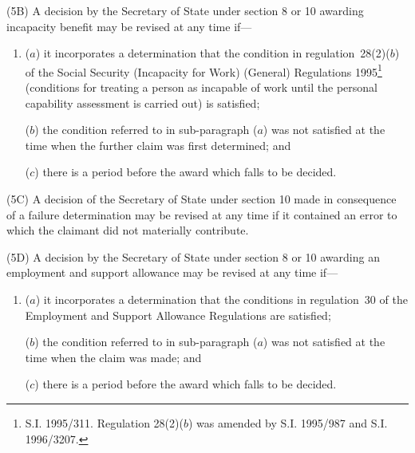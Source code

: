 \documentclass[12pt,a4paper]{article}
\begin{document}
(5B) A decision by the Secretary of State under section 8 or 10 awarding incapacity benefit may be revised at any time if—
\begin{enumerate}\item[]
\begin{sloppypar}
($a$) it incorporates a determination that the condition in regulation~28(2)($b$)  of the Social Security (Incapacity for Work) (General) Regulations 1995\footnote{S.I. 1995/311. Regulation 28(2)($b$) was amended by S.I. 1995/987 and S.I. 1996/3207.} (conditions for treating a person as incapable of work until the personal capability assessment is carried out) is satisfied;
\end{sloppypar}

($b$) the condition referred to in sub-paragraph ($a$)  was not satisfied at the time when the further claim was first determined; and

($c$) there is a period before the award which falls to be decided.
\end{enumerate}

(5C) A decision of the Secretary of State under section 10 made in consequence of a failure determination may be revised at any time if it contained an error to which the claimant did 
not materially contribute.

%
%

(5D) A decision by the Secretary of State under section 8 or 10 awarding an employment and support allowance may be revised at any time if—
\begin{enumerate}\item[]
($a$) it incorporates a determination that the conditions in regulation~30 of the Employment and Support Allowance Regulations are satisfied;

($b$) the condition referred to in sub-paragraph ($a$) was not satisfied at the time when the claim was made; and

($c$) there is a period before the award which falls to be decided.
\end{enumerate}
\end{document}
